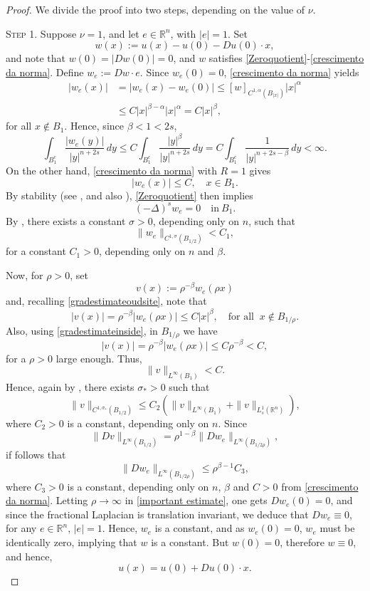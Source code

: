 \documentclass[11pt,reqno]{amsart}
\numberwithin{equation}{section}
\numberwithin{theorem}{section}
\numberwithin{lemma}{section}
\numberwithin{corollary}{section}
\numberwithin{remark}{section}
\numberwithin{proposition}{section}
\numberwithin{definition}{section}
\newcommand{\R}{\mathbb{R}}
\begin{document}
\begin{proof} 
We divide the proof into two steps, depending on the value of $\nu$.

\medskip

\textsc{Step 1.} Suppose $\nu=1$, and let $e\in\R^n$, with $|e|=1$. Set 
$$
w(x):=u(x)-u(0)-Du(0)\cdot x,
$$
and note that $w(0)=|Dw(0)|=0$, and $w$ satisfies \eqref{Zeroquotient}-\eqref{crescimento da norma}. Define $w_e:= Dw\cdot e$. Since $w_e(0)=0$, \eqref{crescimento da norma} yields
\begin{equation}\label{gradestimateoudsite}
    \begin{split}
    |w_e(x)|&= |w_e(x)-w_e(0)|\leq [w]_{C^{1,\alpha}(B_{|x|})}|x|^{\alpha}\\
    &\le C |x|^{\beta-\alpha} |x|^{\alpha}=C|x|^\beta,
    \end{split}
\end{equation}
for all $x \notin B_1$. Hence, since $\beta<1<2s$,
$$
\int_{B_1^c}\frac{|w_e(y)|}{|y|^{n+2s}}\,dy \leq C \int_{B_1^c}\frac{|y|^\beta}{|y|^{n+2s}}\,dy = C \int_{B_1^c}\frac{1}{|y|^{n+2s-\beta}}\,dy<\infty.
$$
On the other hand, \eqref{crescimento da norma} with $R=1$ gives
\begin{equation}\label{gradestimateinside}
    |w_e(x)|\le C, \quad x \in  B_1.
\end{equation}
By stability (see \cite[Lemma 5]{CS11}, and also \cite[Lemma 4.5 and Corollary 4.7]{CS09}), \eqref{Zeroquotient} then implies 
$$
(-\Delta)^s w_e=0 \quad \textrm{in} \ B_1.
$$
By , there exists a constant $\sigma>0$, depending only on $n$, such that
$$
\|w_e\|_{C^{1,\sigma}\left( B_{1/2} \right)}<C_1,
$$
for a constant $C_1>0$, depending only on $n$ and $\beta$. 

Now, for $\rho>0$, set 
$$
v(x):=\rho^{-\beta} w_e(\rho x)
$$
and, recalling \eqref{gradestimateoudsite}, note that 
$$
|v(x)|=\rho^{-\beta}|w_e(\rho x)|\le C|x|^\beta, \quad\mbox{for all }\ x \notin B_{1/\rho}.
$$
Also, using \eqref{gradestimateinside}, in $B_{1/\rho}$ we have
$$
|v(x)|=\rho^{-\beta}|w_e(\rho x)|\le C\rho^{-\beta}<C,
$$
for a $\rho>0$ large enough. Thus,
$$
\|v\|_{L^\infty(B_1)}<C.
$$
Hence, again by , there exists $\sigma_*>0$ such that 
$$
\|v\|_{C^{1,\sigma_*}(B_{1/2})}\le C_2 \left(\|v\|_{L^{\infty}(B_1)}+\|v\|_{L^1_{s}(\R^n)}\right),
$$
where $C_2>0$ is a constant, depending only on $n$. Since
$$
\| Dv\|_{L^{\infty}(B_{1/2})}=\rho^{1-\beta}\| Dw_e\|_{L^{\infty}(B_{1/2\rho})},
$$
if follows that  
\begin{equation}\label{important estimate}
    \| Dw_e\|_{L^{\infty}(B_{1/2\rho})}\le\rho^{\beta-1}C_3,
\end{equation}
where $C_3>0$ is a constant, depending only on $n$, $\beta$ and $C>0$ from \eqref{crescimento da norma}. Letting $\rho\to\infty$ in \eqref{important estimate}, one gets $Dw_e(0)=0$, and since the fractional Laplacian is translation invariant, we deduce that $Dw_e\equiv 0$, for any $e\in\R^n$, $|e|=1$. Hence, $w_e$ is a constant, and as $w_e(0)=0$, $w_e$ must be identically zero, implying that $w$ is a constant. But $w(0)=0$, therefore $w\equiv0$, and hence, 
$$
u(x)=u(0)+Du(0)\cdot x.
$$


\end{proof}
\end{document}
